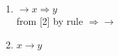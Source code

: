 \begin{enumerate}
\item $ \rightarrow  x  \Rightarrow  y$\\
 from [2] by rule $ \Rightarrow \rightarrow $
\item $x \rightarrow  y$
\end{enumerate}
